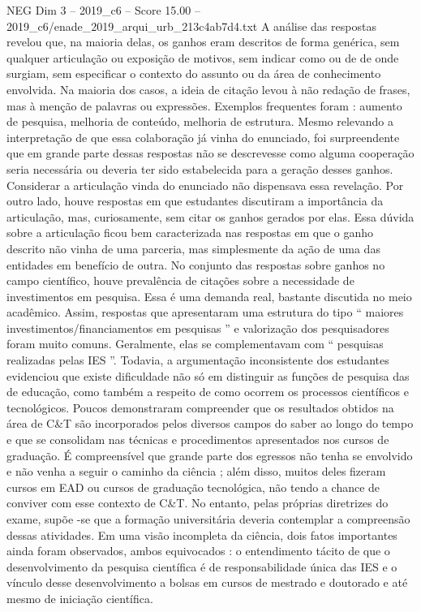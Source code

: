 \begin{textsample}{NEG Dim 3 – 2019\_c6 – Score 15.00 – 2019\_c6/enade\_2019\_arqui\_urb\_213c4ab7d4.txt}
A análise das respostas revelou que, na maioria delas, os ganhos eram descritos de forma genérica, sem qualquer articulação ou exposição de motivos, sem indicar como ou de de onde surgiam, sem especificar o contexto do assunto ou da área de conhecimento envolvida.
Na maioria dos casos, a ideia de citação levou à não redação de frases, mas à menção de palavras ou expressões.
Exemplos frequentes foram : aumento de pesquisa, melhoria de conteúdo, melhoria de estrutura.
Mesmo relevando a interpretação de que essa colaboração já vinha do enunciado, foi surpreendente que em grande parte dessas respostas não se descrevesse como alguma cooperação seria necessária ou deveria ter sido estabelecida para a geração desses ganhos.
Considerar a articulação vinda do enunciado não dispensava essa revelação.
Por outro lado, houve respostas em que estudantes discutiram a importância da articulação, mas, curiosamente, sem citar os ganhos gerados por elas.
Essa dúvida sobre a articulação ficou bem caracterizada nas respostas em que o ganho descrito não vinha de uma parceria, mas simplesmente da ação de uma das entidades em benefício de outra.
No conjunto das respostas sobre ganhos no campo científico, houve prevalência de citações sobre a necessidade de investimentos em pesquisa.
Essa é uma demanda real, bastante discutida no meio acadêmico.
Assim, respostas que apresentaram uma estrutura do tipo “ maiores investimentos/financiamentos em pesquisas ” e valorização dos pesquisadores foram muito comuns.
Geralmente, elas se complementavam com “ pesquisas realizadas pelas IES ”.
Todavia, a argumentação inconsistente dos estudantes evidenciou que existe dificuldade não só em distinguir as funções de pesquisa das de educação, como também a respeito de como ocorrem os processos científicos e tecnológicos.
Poucos demonstraram compreender que os resultados obtidos na área de C\&T são incorporados pelos diversos campos do saber ao longo do tempo e que se consolidam nas técnicas e procedimentos apresentados nos cursos de graduação.
É compreensível que grande parte dos egressos não tenha se envolvido e não venha a seguir o caminho da ciência ; além disso, muitos deles fizeram cursos em EAD ou cursos de graduação tecnológica, não tendo a chance de conviver com esse contexto de C\&T.
No entanto, pelas próprias diretrizes do exame, supõe -se que a formação universitária deveria contemplar a compreensão dessas atividades.
Em uma visão incompleta da ciência, dois fatos importantes ainda foram observados, ambos equivocados : o entendimento tácito de que o desenvolvimento da pesquisa científica é de responsabilidade única das IES e o vínculo desse desenvolvimento a bolsas em cursos de mestrado e doutorado e até mesmo de iniciação científica.

\end{textsample}
